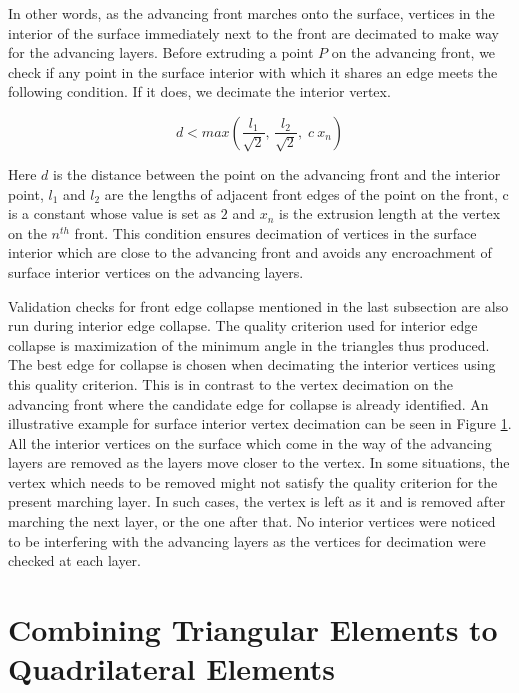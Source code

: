 \begin{figure}[hbt!]
\label{interior-vert-collapse}
\end{figure}

In other words, as the advancing front marches onto the surface, vertices in the interior of the surface immediately next to the front are decimated to make way for the advancing layers. Before extruding a point $P$ on the advancing front, we check if any point in the surface interior with which it shares an edge meets the following condition. If it does, we decimate the interior vertex.

\begin{equation}
    d < max \left( \frac{l_{1}}{\sqrt{2}}, \, \frac{l_{2}}{\sqrt{2}}, \; c \:\mathit{x_n}\right)
    \label{collapse-eq}
\end{equation}

Here $d$ is the distance between the point on the advancing front and the interior point, $l_1$ and $l_2$ are the lengths of adjacent front edges of the point on the front, c is a constant whose value is set as $2$ and $x_n$ is the extrusion length at the vertex on the $n^{th}$ front. This condition ensures decimation of vertices in the surface interior which are close to the advancing front and avoids any encroachment of surface interior vertices on the advancing layers. 

Validation checks for front edge collapse mentioned in the last subsection are also run during interior edge collapse. The quality criterion used for interior edge collapse is maximization of the minimum angle in the triangles thus produced. The best edge for collapse is chosen when decimating the interior vertices using this quality criterion. This is in contrast to the vertex decimation on the advancing front where the candidate edge for collapse is already identified. An illustrative example for surface interior vertex decimation can be seen in Figure \ref{interior-vert-collapse}. All the interior vertices on the surface which come in the way of the advancing layers are removed as the layers move closer to the vertex. In some situations, the vertex which needs to be removed might not satisfy the quality criterion for the present marching layer. In such cases, the vertex is left as it and is removed after marching the next layer, or the one after that. No interior vertices were noticed to be interfering with the advancing layers as the vertices for decimation were checked at each layer.

\section{Combining Triangular Elements to Quadrilateral Elements}

